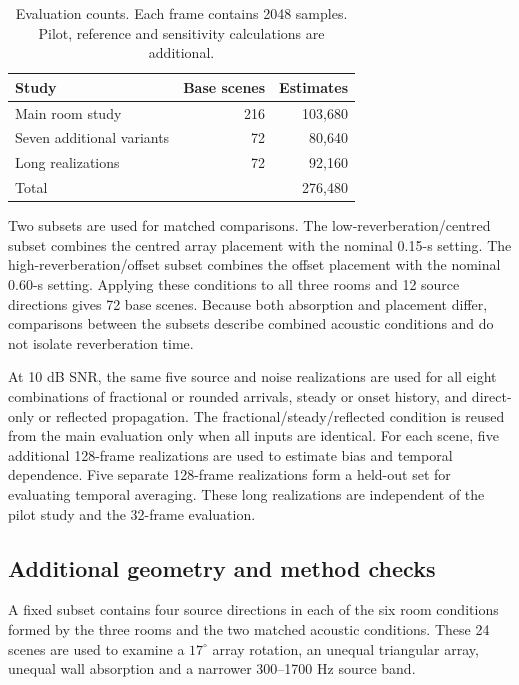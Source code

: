 \documentclass{edpsci}
\begin{document}
\begin{table}[t]
	\caption{Evaluation counts. Each frame contains 2048 samples. Pilot, reference and sensitivity calculations are additional.}
	\label{tab:protocol}
	\centering
	\small
	\begin{tabular}{@{}lrr@{}}
		\toprule
		Study & Base scenes & Estimates\\
		\midrule
		Main room study & 216 & 103,680\\
		Seven additional variants & 72 & 80,640\\
		Long realizations & 72 & 92,160\\
		\midrule
		Total & & 276,480\\
		\bottomrule
	\end{tabular}
\end{table}

Two subsets are used for matched comparisons. The low-reverberation/centred subset combines the centred array placement with the nominal 0.15-s setting. The high-reverberation/offset subset combines the offset placement with the nominal 0.60-s setting. Applying these conditions to all three rooms and 12 source directions gives 72 base scenes. Because both absorption and placement differ, comparisons between the subsets describe combined acoustic conditions and do not isolate reverberation time.

At 10 dB SNR, the same five source and noise realizations are used for all eight combinations of fractional or rounded arrivals, steady or onset history, and direct-only or reflected propagation. The fractional/steady/reflected condition is reused from the main evaluation only when all inputs are identical. For each scene, five additional 128-frame realizations are used to estimate bias and temporal dependence. Five separate 128-frame realizations form a held-out set for evaluating temporal averaging. These long realizations are independent of the pilot study and the 32-frame evaluation.

\subsection{Additional geometry and method checks}

A fixed subset contains four source directions in each of the six room conditions formed by the three rooms and the two matched acoustic conditions. These 24 scenes are used to examine a $17^\circ$ array rotation, an unequal triangular array, unequal wall absorption and a narrower 300--1700 Hz source band.
\end{document}
